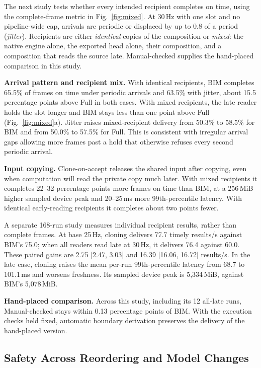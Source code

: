 \documentclass[conference]{IEEEtran}
\newcommand{\MiB}{\,MiB}
\newcommand{\ms}{\,ms}
\newcommand{\Hz}{\,Hz}
\begin{document}
The next study tests whether every intended recipient completes on time, using the complete-frame metric in Fig.~\ref{fig:mixed}. At 30\Hz{} with one slot and no pipeline-wide cap, arrivals are periodic or displaced by up to 0.8 of a period (\emph{jitter}). Recipients are either \emph{identical} copies of the composition or \emph{mixed}: the native engine alone, the exported head alone, their composition, and a composition that reads the source late. Manual-checked supplies the hand-placed comparison in this study.

\textbf{Arrival pattern and recipient mix.} With identical recipients, BIM completes 65.5\% of frames on time under periodic arrivals and 63.5\% with jitter, about 15.5 percentage points above Full in both cases. With mixed recipients, the late reader holds the slot longer and BIM stays less than one point above Full (Fig.~\ref{fig:mixed}a). Jitter raises mixed-recipient delivery from 50.3\% to 58.5\% for BIM and from 50.0\% to 57.5\% for Full. This is consistent with irregular arrival gaps allowing more frames past a hold that otherwise refuses every second periodic arrival.

\textbf{Input copying.} Clone-on-accept releases the shared input after copying, even when computation will read the private copy much later. With mixed recipients it completes 22--32 percentage points more frames on time than BIM, at a 256\MiB{} higher sampled device peak and 20--25\ms{} more 99th-percentile latency. With identical early-reading recipients it completes about two points fewer.

A separate 168-run study measures individual recipient results, rather than complete frames. At base 25\Hz, cloning delivers 77.7 timely results/s against BIM's 75.0; when all readers read late at 30\Hz, it delivers 76.4 against 60.0. These paired gains are 2.75 [2.47, 3.03] and 16.39 [16.06, 16.72] results/s. In the late case, cloning raises the mean per-run 99th-percentile latency from 68.7 to 101.1\ms{} and worsens freshness. Its sampled device peak is 5,334\MiB, against BIM's 5,078\MiB.

\textbf{Hand-placed comparison.} Across this study, including its 12 all-late runs, Manual-checked stays within 0.13 percentage points of BIM. With the execution checks held fixed, automatic boundary derivation preserves the delivery of the hand-placed version.

\subsection{Safety Across Reordering and Model Changes}
\label{sec:eval-safety}
\end{document}
